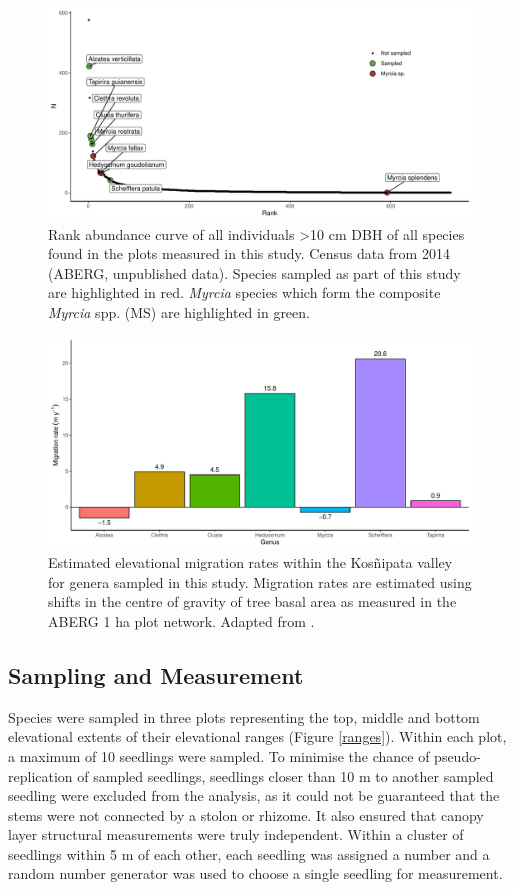 \documentclass[a4paper, 11pt]{article}
\begin{document}



\begin{figure}[H]
\includegraphics[width=\textwidth]{rank_abund}
\centering
\caption{Rank abundance curve of all individuals \textgreater{}10 cm DBH of all species found in the plots measured in this study. Census data from 2014 (ABERG, unpublished data). Species sampled as part of this study are highlighted in red. \textit{Myrcia} species which form the composite \textit{Myrcia} spp. (MS) are highlighted in green.}
\label{rank_abund}
\end{figure}

\begin{figure}[H]
\includegraphics[width=\textwidth]{mig}
\centering
\caption{Estimated elevational migration rates within the Kos\~{n}ipata valley for genera sampled in this study. Migration rates are estimated using shifts in the centre of gravity of tree basal area as measured in the ABERG 1 ha plot network. Adapted from \citep{Whitaker2014}.}
\label{mig}
\end{figure}


\subsection{Sampling and Measurement}
Species were sampled in three plots representing the top, middle and bottom elevational extents of their elevational ranges (Figure \ref{ranges}). Within each plot, a maximum of 10 seedlings were sampled. To minimise the chance of pseudo-replication of sampled seedlings, seedlings closer than 10 m to another sampled seedling were excluded from the analysis, as it could not be guaranteed that the stems were not connected by a stolon or rhizome. It also ensured that canopy layer structural measurements were truly independent. Within a cluster of seedlings within 5 m of each other, each seedling was assigned a number and a random number generator was used to choose a single seedling for measurement.
\end{document}

